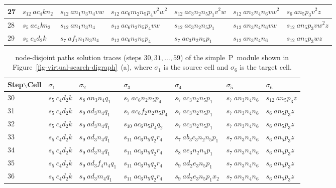 \documentclass[preliminary,copyright,creativecommons]{eptcs}
\theoremstyle{remark}
\begin{document}
\begin{table}[h]
\begin{center}
\begin{tabular}{ | l | l | l | l | l | l | l | }
27 & $s_{12}~ ac_4kn_2$ & $s_{12}~ an_1n_3n_4vw$ & $s_{12}~ ac_6m_2n_5p_4v^{2}w^{2}$ & $s_{12}~ ac_3n_2n_5p_1v^{2}w$ & $s_{12}~ an_3n_4n_6vw^{2}$ & $s_6~ an_5p_3v^{2}z$ \\ \hline
28 & $s_5~ ac_4kn_2$ & $s_{12}~ an_1n_3n_4$ & $s_{12}~ ac_6n_2n_5p_4vw$ & $s_{12}~ ac_3n_2n_5p_1$ & $s_{12}~ an_3n_4n_6vw$ & $s_{12}~ an_5p_3vw^{2}z$ \\ \hline
29 & $s_5~ c_4d_2k$ & $s_7~ af_1n_1n_3n_4$ & $s_{12}~ ac_6n_2n_5p_4$ & $s_7~ ac_3n_2n_5p_1$ & $s_{12}~ an_3n_4n_6$ & $s_{12}~ an_5p_3wz$ \\ \hline
\end{tabular}
\end{center}
\end{table}

\begin{table}[h]
\caption{node-disjoint paths solution traces (steps $30, 31, \ldots, 59$) of the 
simple~P~module shown in Figure~\ref{fig-virtual-search-digraph}~(a),
where $\sigma_1$ is the source cell and $\sigma_6$ is the target cell.}
\label{tab-trace1-node}
\begin{center}
\renewcommand{\tabcolsep}{3.0pt}
\renewcommand{\arraystretch}{1.3}
\footnotesize
\noindent
\begin{tabular}{ | l | l | l | l | l | l | l | }
\hline
Step$\backslash$Cell
 & $\sigma_1$ & $\sigma_2$ & $\sigma_3$ & $\sigma_4$ & $\sigma_5$ & $\sigma_6$ \\ \hline
30 & $s_5~ c_4d_2k$ & $s_8~ an_3n_4q_1$ & $s_7~ ac_6n_2n_5p_4$ & $s_7~ ac_3n_2n_5p_1$ & $s_7~ an_3n_4n_6$ & $s_{12}~ an_5p_3z$ \\ \hline
31 & $s_5~ c_4d_2k$ & $s_9~ ad_3n_4q_1$ & $s_7~ ac_6f_2n_2n_5p_4$ & $s_7~ ac_3n_2n_5p_1$ & $s_7~ an_3n_4n_6$ & $s_6~ an_5p_3z$ \\ \hline
32 & $s_5~ c_4d_2k$ & $s_9~ ad_3n_4q_1$ & $s_{10}~ ac_6n_5p_4q_2$ & $s_7~ ac_3n_2n_5p_1$ & $s_7~ an_3n_4n_6$ & $s_6~ an_5p_3z$ \\ \hline
33 & $s_5~ c_4d_2k$ & $s_9~ ad_3n_4q_1$ & $s_{11}~ ac_6n_5q_2r_4$ & $s_7~ ab_3c_3n_2n_5p_1$ & $s_7~ an_3n_4n_6$ & $s_6~ an_5p_3z$ \\ \hline
34 & $s_5~ c_4d_2k$ & $s_9~ ad_3n_4q_1$ & $s_{11}~ ac_6n_5q_2r_4$ & $s_8~ ae_3n_2n_5p_1$ & $s_7~ an_3n_4n_6$ & $s_6~ an_5p_3z$ \\ \hline
35 & $s_5~ c_4d_2k$ & $s_9~ ad_3f_4n_4q_1$ & $s_{11}~ ac_6n_5q_2r_4$ & $s_9~ ad_2e_3n_5p_1$ & $s_7~ an_3n_4n_6$ & $s_6~ an_5p_3z$ \\ \hline
36 & $s_5~ c_4d_2k$ & $s_9~ ad_3m_4q_1$ & $s_{11}~ ac_6n_5q_2r_4$ & $s_9~ ad_2e_3n_5p_1x_2$ & $s_7~ an_3n_4n_6$ & $s_6~ an_5p_3z$ \\ \hline

\end{tabular}
\end{center}
\end{table}
\end{document}
